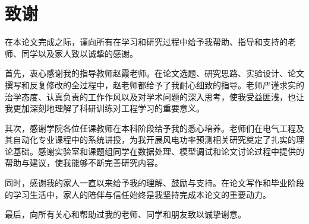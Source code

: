 \documentclass[AutoFakeBold=2.5]{myclass}
\begin{document}
\tableofcontents


\setcounter{page}{1} %
\pagestyle{fancy}

\setlength{\baselineskip}{20pt}
\selectfont
\clearpage

\clearpage

\clearpage

\clearpage

\clearpage

\clearpage
{}
{}

\clearpage
{}
{}
\section*{致谢}
在本论文完成之际，谨向所有在学习和研究过程中给予我帮助、指导和支持的老师、同学以及家人致以诚挚的感谢。

首先，衷心感谢我的指导教师赵霞老师。在论文选题、研究思路、实验设计、论文撰写和反复修改的全过程中，赵老师都给予了我耐心细致的指导。老师严谨求实的治学态度、认真负责的工作作风以及对学术问题的深入思考，使我受益匪浅，也让我更加深刻地理解了科研训练对工程学习的重要意义。

其次，感谢学院各位任课教师在本科阶段给予我的悉心培养。老师们在电气工程及其自动化专业课程中的系统讲授，为我开展风电功率预测相关研究奠定了扎实的理论基础。感谢实验室和课题组同学在数据处理、模型调试和论文讨论过程中提供的帮助与建议，使我能够不断完善研究内容。

同时，感谢我的家人一直以来给予我的理解、鼓励与支持。在论文写作和毕业阶段的学习生活中，家人的陪伴与信任始终是我坚持完成本论文的重要动力。

最后，向所有关心和帮助过我的老师、同学和朋友致以诚挚谢意。

\clearpage
{}
{}

\end{document}

